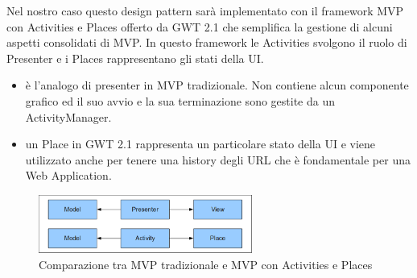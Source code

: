 Nel nostro caso questo design pattern sar\`a implementato con il framework MVP con
Activities e Places offerto da GWT 2.1 che semplifica la gestione di alcuni
aspetti consolidati di MVP. In questo framework le Activities svolgono il ruolo
di Presenter e i Places rappresentano gli stati della UI.
\begin{itemize}
  \item{ }
  \`e l'analogo di presenter in MVP tradizionale. Non contiene alcun componente
  grafico ed il suo avvio e la sua terminazione sono gestite da un
  ActivityManager.
  \item{ }
  un Place in GWT 2.1 rappresenta un particolare stato della UI e viene
  utilizzato anche per tenere una history degli URL che \`e fondamentale per una
  Web Application.

\end{itemize} 
\begin{figure}[h]
\centering
\includegraphics[width=7cm]{img/ST/mvpap.png}
\caption{Comparazione tra MVP tradizionale e MVP con Activities e Places}
\end{figure}

\newpage


